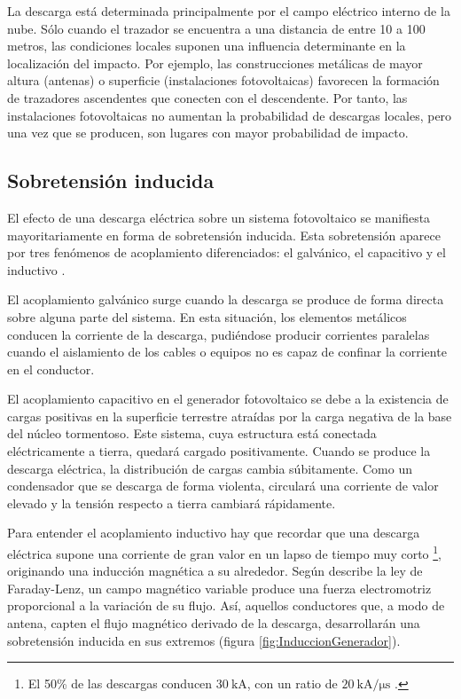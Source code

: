 La descarga está determinada principalmente por el campo eléctrico
interno de la nube. Sólo cuando el trazador se encuentra a una distancia
de entre 10 a 100 metros, las condiciones locales suponen una influencia
determinante en la localización del impacto. Por ejemplo, las construcciones
metálicas de mayor altura (antenas) o superficie (instalaciones fotovoltaicas)
favorecen la formación de trazadores ascendentes que conecten con
el descendente. Por tanto, las instalaciones fotovoltaicas no aumentan
la probabilidad de descargas locales, pero una vez que se producen,
son lugares con mayor probabilidad de impacto.


\subsection{Sobretensión inducida}

El efecto de una descarga eléctrica sobre un sistema fotovoltaico
se manifiesta mayoritariamente en forma de sobretensión inducida.
Esta sobretensión aparece por tres fenómenos de acoplamiento diferenciados:
el galvánico, el capacitivo y el inductivo \cite{Becker.Vaaben.ea2000}.

El acoplamiento galvánico surge cuando la descarga se produce de forma
directa sobre alguna parte del sistema. En esta situación, los elementos
metálicos conducen la corriente de la descarga, pudiéndose producir
corrientes paralelas cuando el aislamiento de los cables o equipos
no es capaz de confinar la corriente en el conductor.

El acoplamiento capacitivo en el generador fotovoltaico se debe a
la existencia de cargas positivas en la superficie terrestre atraídas
por la carga negativa de la base del núcleo tormentoso. Este sistema,
cuya estructura está conectada eléctricamente a tierra, quedará cargado
positivamente. Cuando se produce la descarga eléctrica, la distribución
de cargas cambia súbitamente. Como un condensador que se descarga
de forma violenta, circulará una corriente de valor elevado y la tensión
respecto a tierra cambiará rápidamente. 

Para entender el acoplamiento inductivo hay que recordar que una descarga
eléctrica supone una corriente de gran valor en un lapso de tiempo
muy corto%
\footnote{El 50\% de las descargas conducen $\SI{30}{\kilo\ampere}$, con un
ratio de $\SI{20}{\kilo\ampere\per\micro\second}$ \cite{Becker.Vaaben.ea2000}.%
}, originando una inducción magnética a su alrededor. Según describe
la ley de Faraday-Lenz, un campo magnético variable produce una fuerza
electromotriz proporcional a la variación de su flujo. Así, aquellos
conductores que, a modo de antena, capten el flujo magnético derivado
de la descarga, desarrollarán una sobretensión inducida en sus extremos
(figura \ref{fig:InduccionGenerador}).

